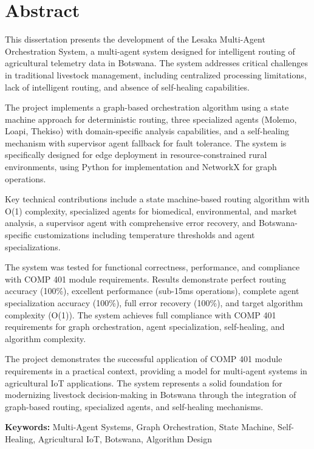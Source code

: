 
\chapter*{Abstract}

This dissertation presents the development of the Lesaka Multi-Agent Orchestration System, a multi-agent system designed for intelligent routing of agricultural telemetry data in Botswana. The system addresses critical challenges in traditional livestock management, including centralized processing limitations, lack of intelligent routing, and absence of self-healing capabilities.

The project implements a graph-based orchestration algorithm using a state machine approach for deterministic routing, three specialized agents (Molemo, Loapi, Thekiso) with domain-specific analysis capabilities, and a self-healing mechanism with supervisor agent fallback for fault tolerance. The system is specifically designed for edge deployment in resource-constrained rural environments, using Python for implementation and NetworkX for graph operations.

Key technical contributions include a state machine-based routing algorithm with O(1) complexity, specialized agents for biomedical, environmental, and market analysis, a supervisor agent with comprehensive error recovery, and Botswana-specific customizations including temperature thresholds and agent specializations.

The system was tested for functional correctness, performance, and compliance with COMP 401 module requirements. Results demonstrate perfect routing accuracy (100\%), excellent performance (sub-15ms operations), complete agent specialization accuracy (100\%), full error recovery (100\%), and target algorithm complexity (O(1)). The system achieves full compliance with COMP 401 requirements for graph orchestration, agent specialization, self-healing, and algorithm complexity.

The project demonstrates the successful application of COMP 401 module requirements in a practical context, providing a model for multi-agent systems in agricultural IoT applications. The system represents a solid foundation for modernizing livestock decision-making in Botswana through the integration of graph-based routing, specialized agents, and self-healing mechanisms.

\textbf{Keywords:} Multi-Agent Systems, Graph Orchestration, State Machine, Self-Healing, Agricultural IoT, Botswana, Algorithm Design
